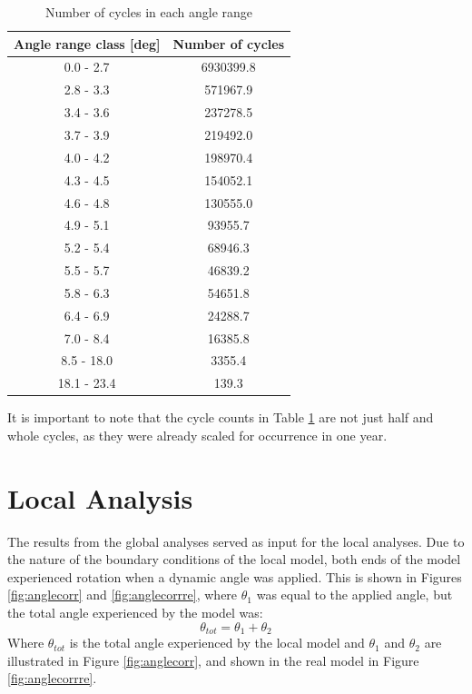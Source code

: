 \begin{table} [H]
\centering
\begin{tabular}{ |c|c|}
\hline
Angle range class [deg] & Number of cycles \\
 \hline
 \hline
0.0 - 2.7 & 6930399.8\\

2.8 - 3.3 & 571967.9\\
 
3.4 - 3.6 & 237278.5 \\
 
3.7 - 3.9& 219492.0  \\

4.0 - 4.2& 198970.4  \\

4.3  - 4.5 & 154052.1  \\

4.6 - 4.8 & 130555.0 \\

4.9 - 5.1 & 93955.7 \\

5.2 - 5.4 & 68946.3 \\

5.5 - 5.7 & 46839.2 \\

5.8 - 6.3 & 54651.8 \\

6.4 - 6.9 & 24288.7 \\

7.0 - 8.4 & 16385.8 \\

8.5 - 18.0 & 3355.4 \\

18.1 - 23.4 & 139.3  \\

 \hline
\end{tabular}
\caption{Number of cycles in each angle range}
\label{table:angleclass}
\end{table} 
It is important to note that the cycle counts in Table \ref{table:angleclass} are not just half and whole cycles, as they were already scaled for occurrence in one year.

\section{Local Analysis}
The results from the global analyses served as input for the local analyses. Due to the nature of the boundary conditions of the local model, both ends of the model experienced rotation when a dynamic angle was applied. This is shown in Figures \ref{fig:anglecorr} and \ref{fig:anglecorrre}, where $\theta_1$ was equal to the applied angle, but the total angle experienced by the model was: 
\begin{equation}
    \theta_{tot}=\theta_1 + \theta_2
\end{equation}
Where $\theta_{tot}$ is the total angle experienced by the local model and $\theta_1$ and $\theta_2$ are illustrated in Figure \ref{fig:anglecorr}, and shown in the real model in Figure \ref{fig:anglecorrre}.

